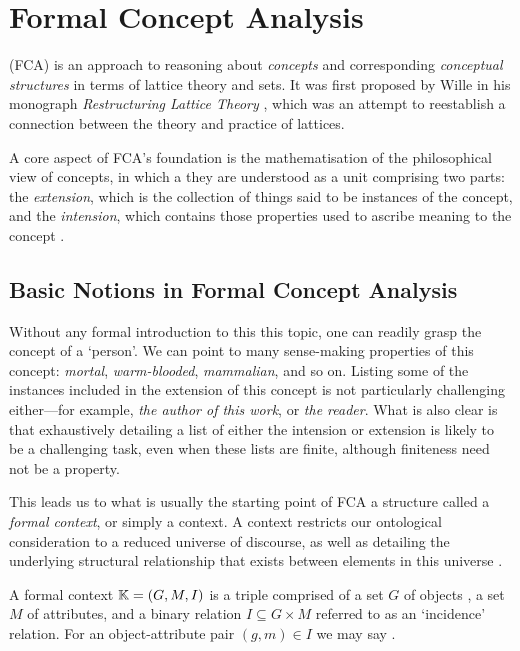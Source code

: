 \chapter{Formal Concept Analysis}
\label{chapter:formal-concept-analysis}


\FCA (FCA) \cite{Wille_Restructuring,WILLE1992493,ganter1999formal} is an
approach to reasoning about \textit{concepts} and corresponding \textit{conceptual
	structures} in terms of lattice theory and sets. It was first proposed by Wille in
his monograph \textit{Restructuring Lattice Theory} \cite{Wille_Restructuring}, which
was an attempt to reestablish a connection between the theory and practice of lattices.

A core aspect of FCA’s foundation is the mathematisation of the philosophical view
of concepts, in which a they are understood as a unit comprising two parts: the \textit{extension},
which is the collection of things said to be instances of the concept, and the
\textit{intension}, which contains those properties used to ascribe meaning to
the concept \cite{DUQUENNE1999407}.

\section{Basic Notions in Formal Concept Analysis}
\label{section:basic-notions}

Without any formal introduction to this this topic, one can readily grasp the
concept of a `person'. We can point to many sense-making properties of this concept:
\textit{mortal}, \textit{warm-blooded}, \textit{mammalian}, and so on. Listing some
of the instances included in the extension of this concept is not particularly challenging
either---for example, \textit{the author of this work}, or \textit{the reader}.
What is also clear is that exhaustively detailing a list of either the intension
or extension is likely to be a challenging task, even when these lists are finite,
although finiteness need not be a property.

This leads us to what is usually the starting point of FCA a structure called a
\textit{formal context}, or simply a context. A context restricts our ontological
consideration to a reduced universe of discourse, as well as detailing the
underlying structural relationship that exists between elements in this universe
\cite{Wille_Restructuring,Dau2005}.

\begin{definition}
	 \label{definition:formal-context} A formal context $\mathbb{K}
		= (G,M,\mathrel{I})$ is a triple comprised of a set $G$ of objects , a set $M$ of attributes,
	and a binary relation $I \subseteq G \times M$ referred to as an `incidence'
	relation. For an object-attribute pair $(g,m) \in I$ we may say .
\end{definition}

